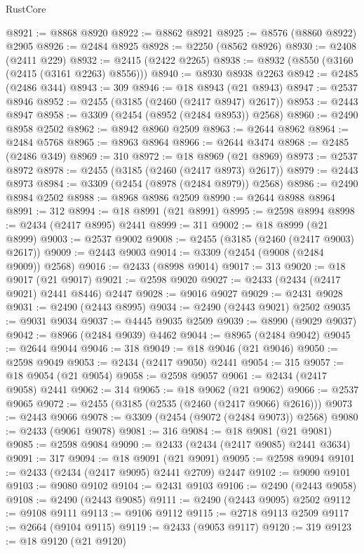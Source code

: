 \begin{lexlean}{RustCore}
\begin{coremodule}
@8921 := @8868 @8920
@8922 := @8862 @8921
@8925 := @8576 (@8860 @8922) @2905
@8926 := @2484 @8925
@8928 := @2250 (@8562 @8926)
@8930 := @2408 (@2411 @229)
@8932 := @2415 (@2422 @2265)
@8938 := @8932 (@8550 (@3160 (@2415 (@3161 @2263) @8556)))
@8940 := @8930 @8938 @2263
@8942 := @2485 (@2486 @344)
@8943 := 309
@8946 := @18 @8943 (@21 @8943)
@8947 := @2537 @8946
@8952 := @2455 (@3185 (@2460 (@2417 @8947) @2617))
@8953 := @2443 @8947
@8958 := @3309 (@2454 (@8952 (@2484 @8953)) @2568)
@8960 := @2490 @8958 @2502
@8962 := @8942 @8960 @2509
@8963 := @2644 @8962
@8964 := @2484 @5768
@8965 := @8963 @8964
@8966 := @2644 @3474
@8968 := @2485 (@2486 @349)
@8969 := 310
@8972 := @18 @8969 (@21 @8969)
@8973 := @2537 @8972
@8978 := @2455 (@3185 (@2460 (@2417 @8973) @2617))
@8979 := @2443 @8973
@8984 := @3309 (@2454 (@8978 (@2484 @8979)) @2568)
@8986 := @2490 @8984 @2502
@8988 := @8968 @8986 @2509
@8990 := @2644 @8988 @8964
@8991 := 312
@8994 := @18 @8991 (@21 @8991)
@8995 := @2598 @8994
@8998 := @2434 (@2417 @8995) @2441
@8999 := 311
@9002 := @18 @8999 (@21 @8999)
@9003 := @2537 @9002
@9008 := @2455 (@3185 (@2460 (@2417 @9003) @2617))
@9009 := @2443 @9003
@9014 := @3309 (@2454 (@9008 (@2484 @9009)) @2568)
@9016 := @2433 (@8998 @9014)
@9017 := 313
@9020 := @18 @9017 (@21 @9017)
@9021 := @2598 @9020
@9027 := @2433 (@2434 (@2417 @9021) @2441 @8446) @2447
@9028 := @9016 @9027
@9029 := @2431 @9028
@9031 := @2490 (@2443 @8995)
@9034 := @2490 (@2443 @9021) @2502
@9035 := @9031 @9034
@9037 := @4445 @9035 @2509
@9039 := @8990 (@9029 @9037)
@9042 := @8966 (@2484 @9039) @4462
@9044 := @8965 (@2484 @9042)
@9045 := @2644 @9044
@9046 := 318
@9049 := @18 @9046 (@21 @9046)
@9050 := @2598 @9049
@9053 := @2434 (@2417 @9050) @2441
@9054 := 315
@9057 := @18 @9054 (@21 @9054)
@9058 := @2598 @9057
@9061 := @2434 (@2417 @9058) @2441
@9062 := 314
@9065 := @18 @9062 (@21 @9062)
@9066 := @2537 @9065
@9072 := @2455 (@3185 (@2535 (@2460 (@2417 @9066) @2616)))
@9073 := @2443 @9066
@9078 := @3309 (@2454 (@9072 (@2484 @9073)) @2568)
@9080 := @2433 (@9061 @9078)
@9081 := 316
@9084 := @18 @9081 (@21 @9081)
@9085 := @2598 @9084
@9090 := @2433 (@2434 (@2417 @9085) @2441 @3634)
@9091 := 317
@9094 := @18 @9091 (@21 @9091)
@9095 := @2598 @9094
@9101 := @2433 (@2434 (@2417 @9095) @2441 @2709) @2447
@9102 := @9090 @9101
@9103 := @9080 @9102
@9104 := @2431 @9103
@9106 := @2490 (@2443 @9058)
@9108 := @2490 (@2443 @9085)
@9111 := @2490 (@2443 @9095) @2502
@9112 := @9108 @9111
@9113 := @9106 @9112
@9115 := @2718 @9113 @2509
@9117 := @2664 (@9104 @9115)
@9119 := @2433 (@9053 @9117)
@9120 := 319
@9123 := @18 @9120 (@21 @9120)

\end{coremodule}
\end{lexlean}
